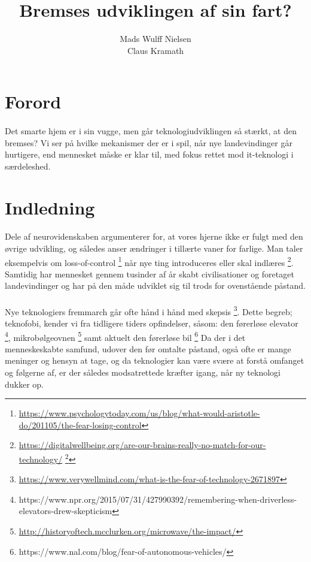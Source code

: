 \documentclass{article}
\title{%
Bremses udviklingen af sin fart?
}
\author{Mads Wulff Nielsen \\
Claus Kramath}
\begin{document}
\maketitle
\thispagestyle{empty}
\newpage
\tableofcontents
\thispagestyle{empty} 
\newpage
\section{Forord}
\paragraph{}
Det smarte hjem er i sin vugge, men går teknologiudviklingen så
stærkt, at den bremses? Vi ser på hvilke mekanismer der er i spil, når nye
landevindinger går hurtigere, end mennesket måske er klar til, med fokus
rettet mod it-teknologi i særdeleshed.
\section{Indledning}
\paragraph{}
Dele af neurovidenskaben argumenterer for, at vores hjerne ikke er fulgt med den øvrige udvikling, 
og således anser ændringer i tillærte vaner for farlige. Man taler eksempelvis om loss-of-control \footnote{\url{https://www.psychologytoday.com/us/blog/what-would-aristotle-do/201105/the-fear-losing-control}}
når nye ting introduceres eller skal indlæres \footnote{\url{https://digitalwellbeing.org/are-our-brains-really-no-match-for-our-technology/} \footnote{https://www.youtube.com/watch?v=JX3RkHtFP4Q}}. 
Samtidig har mennesket gennem tusinder af år skabt civilisationer og foretaget landevindinger og har på den måde udviklet sig til trods for ovenstående påstand.
\paragraph{}
Nye teknologiers fremmarch går ofte hånd i hånd med skepsis \footnote{\url{https://www.verywellmind.com/what-is-the-fear-of-technology-2671897}}.
Dette begreb; teknofobi, kender vi fra tidligere tiders opfindelser, såsom: den førerløse elevator \footnote{https://www.npr.org/2015/07/31/427990392/remembering-when-driverless-elevators-drew-skepticism}, mikrobølgeovnen \footnote{\url{http://historyoftech.mcclurken.org/microwave/the-impact/}}
samt aktuelt den førerløse bil \footnote{https://www.nal.com/blog/fear-of-autonomous-vehicles/}
Da der i det menneskeskabte samfund, udover den før omtalte påstand, også ofte er mange meninger og hensyn at tage, og da teknologier kan være svære at forstå omfanget og følgerne af, er der således modsatrettede kræfter igang, når ny teknologi dukker op.
\end{document}
